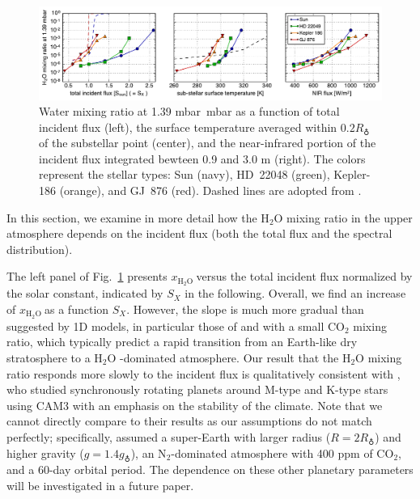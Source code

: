 \documentclass[11pt,numberedappendix,twocolappendix,]{emulateapj}
\def\water{H$_2$O }
\def\xwater{\dsa{$x_\text{\water}$}}
\def\preslevel{1.39 mbar\ }
\newcommand{\dsa}[1]{{\color{blue}#1}}
\newcommand{\yf}[1]{{\color{orange}#1}}
\begin{document}
\begin{figure}[!tb]
    \begin{center}
    \includegraphics[width=\hsize]{fig/xH2O_3panels.pdf}
    \end{center}
\caption{Water mixing ratio at \preslevel mbar as a function of total incident flux (left), the surface temperature \yf{averaged within $0.2R_\earth$ of the substellar point} (center), and the near-infrared portion of the incident flux integrated bewteen 0.9 and 3.0 \textmu m (right). The colors represent the stellar types: Sun (navy), HD~22048 (green), Kepler-186 (orange), and GJ~876 (red). Dashed lines are adopted from \citet{Kasting1993}. }                                                                                                             
\label{fig:xH2O_S0X}
\end{figure}

In this section, we examine in more detail how the \water mixing ratio in the upper atmosphere depends on the incident flux (both the total flux and the spectral distribution). 

The left panel of Fig.~\ref{fig:xH2O_S0X} presents \xwater versus the total incident flux normalized by the solar constant, indicated by $S_X$ in the following. 
Overall, we find an increase of \xwater as a function $S_X$. 
However, the slope is much more gradual than suggested by 1D models, in particular those  of \citet{Kasting1993} and \citet{Wordsworth2013} with a small CO$_2$ mixing ratio, which typically predict a rapid transition from an Earth-like dry stratosphere to a \water-dominated atmosphere. 
Our result that the \water mixing ratio responds more slowly to the incident flux is qualitatively consistent with \citet{Yang2013}, who studied synchronously rotating planets around M-type and K-type stars using CAM3 with an emphasis on the stability of the climate. 
Note that we cannot directly compare to their results as our assumptions do not match perfectly; specifically, \cite{Yang2013} assumed a super-Earth with larger radius ($R=2R_\earth$) and higher gravity ($g=1.4g_\earth$), an N$_2$-dominated atmosphere with 400 ppm of CO$_2$, and a 60-day orbital period. 
The dependence on these other planetary parameters will be investigated in a future paper. 
\end{document}
